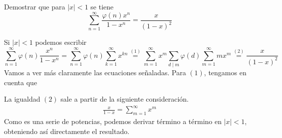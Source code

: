 \documentclass[twoside]{article}
\begin{document}
\newpage

\begin{ejercicio}{12}
Demostrar que para $|x| < 1$ se tiene
\[ \sum_{n=1}^{∞} \frac{φ(n) x^n}{1-x^n} = \frac{x}{(1-x)^2} \]
\end{ejercicio}
\begin{solucion}
Si $|x|<1$ podemos escribir
$$
\sum_{n=1}^{∞} φ(n)\frac{ x^n}{1-x^n} = \sum_{n=1}^{∞} φ(n)\sum_{k=1}^\infty x^{kn} \overset{(1)}{=} \sum_{m=1}^\infty x^m\sum_{d \mid m}\varphi(d) \sum_{m=1}^\infty m x^m \overset{(2)}{=}\frac{x}{(1-x)^2}
$$
Vamos a ver más claramente las ecuaciones señaladas. Para $(1)$, tengamos en cuenta que 

La igualdad $(2)$ sale a partir de la siguiente consideración. 
\begin{align*}
\frac{x}{1-x} = \sum_{m=1}^\infty x^m
\end{align*}
Como es una serie de potencias, podemos derivar término a término en $|x|<1$, obteniendo así directamente el resultado.
\end{solucion}

\newpage
\end{document}
